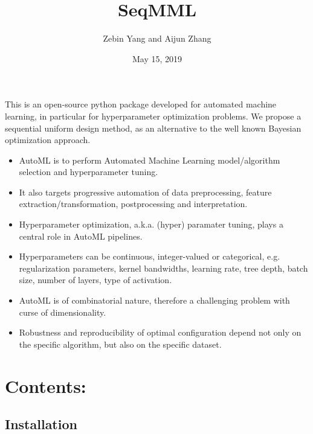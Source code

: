 \documentclass[letterpaper,10pt,english]{sphinxmanual}
\title{SeqMML}
\date{May 15, 2019}
\author{Zebin Yang and Aijun Zhang}
\begin{document}
\pagestyle{empty}
\sphinxmaketitle
\pagestyle{plain}
\sphinxtableofcontents
\pagestyle{normal}
\label{\detokenize{index::doc}}


This is an open-source python package developed for automated machine learning, in particular for hyperparameter optimization problems. We propose a sequential uniform design method, as an alternative to the well known Bayesian optimization approach.

\begin{itemize}
\item {} 
AutoML is to perform Automated Machine Learning model/algorithm selection and hyperparameter tuning.

\item {} 
It also targets progressive automation of data preprocessing, feature extraction/transformation, postprocessing and interpretation.

\item {} 
Hyperparameter optimization, a.k.a. (hyper) paramater tuning, plays a central role in AutoML pipelines.

\end{itemize}

\noindent{}

\begin{itemize}
\item {} 
Hyperparameters can be continuous, integer-valued or categorical, e.g. regularization parameters, kernel bandwidths, learning rate, tree depth, batch size, number of layers, type of activation.

\item {} 
AutoML is of combinatorial nature, therefore a challenging problem with curse of dimensionality.

\item {} 
Robustness and reproducibility of optimal configuration depend not only on the specific algorithm, but also on the specific dataset.

\end{itemize}


\chapter{Contents:}
\label{\detokenize{index:contents}}

\section{Installation}
\label{\detokenize{installation:installation}}\label{\detokenize{installation::doc}}
\end{document}
